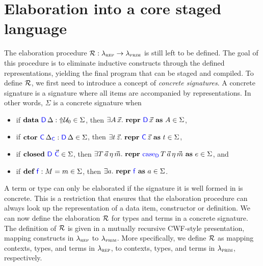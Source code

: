 \section{Elaboration into a core staged language}\label{sec:elaboration}

The elaboration procedure $\mathcal{R} {} : \lambda_{\textsc{rep}} \to \lambda_{\textsc{prim}}$ is still left
to be defined. The goal of this procedure is to eliminate inductive constructs
through the defined representations, yielding the final program that can be
staged and compiled. To define $\mathcal{R} {}$, we first need to introduce a concept
of \emph{concrete signatures}. A concrete signature is a signature where all
items are accompanied by representations. In other words, $\Sigma$ is a
concrete signature when
\begin{itemize}
  \item if $\textbf{data} \ {\color{blue}{\mathsf{D}}} \, {\Delta} : \text{$\Uparrow$}{\mathcal{U}_0} \in \Sigma$, then $\exists A \, \vec{x} .\
          \textbf{repr} \ {\color{blue}{\mathsf{D}}}\, {\vec{x}}\ \textbf{as}\ {A} \in \Sigma$,
  \item if $\textbf{ctor} \ {\color{blue}{\mathsf{C}}} \, {\Delta_{{\color{blue}{\mathsf{C}}}}} : {\color{blue}{\mathsf{D}}}\, {\Delta} \in \Sigma$, then $\exists
          t\,\vec{z} .\ \textbf{repr} \ {{\color{blue}{\mathsf{C}}}}\, {\vec{z}}\ \textbf{as}\ {t} \in \Sigma$,
  \item if $\textbf{closed}\ {\color{blue}{\mathsf{D}}} \ \vec{{\color{blue}{\mathsf{C}}}} \in \Sigma$, then $\exists
          T\,\vec{a}\,\eta\,\vec{m} .\ \Srepr{\caselab{D}}{T\,\vec{a}\,\eta\,\vec{m} }{e}
          \in \Sigma$, and
  \item if $\textbf{def} \ {\color{blue}{\mathsf{f}}} : {M} = {m} \in \Sigma$, then $\exists a .\ \textbf{repr} \ {\color{blue}{\mathsf{f}}}\ \textbf{as}\ {a} \in
          \Sigma$.
\end{itemize}
A term or type can only be elaborated if the signature it is well formed in is
concrete. This is a restriction that ensures that the elaboration procedure
can always look up the representation of a data item, constructor or definition.
We can now define the elaboration $\mathcal{R} {}$ for types and terms in a concrete
signature. The definition of $\mathcal{R} {}$ is given in a mutually recursive
CWF-style presentation, mapping constructs in $\lambda_{\textsc{rep}}$ to $\lambda_{\textsc{prim}}$.
More specifically, we define $\mathcal{R} {}$ as mapping contexts, types, and terms in 
$\lambda_{\textsc{rep}}$, to contexts, types, and terms in $\lambda_{\textsc{prim}}$, respectively.

